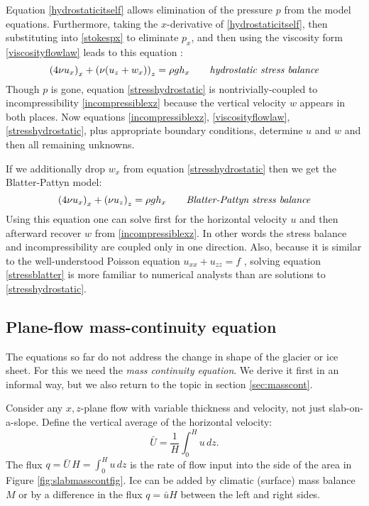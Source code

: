 \documentclass[letterpaper,final,12pt,reqno]{amsart}
\begin{document}
Equation \eqref{hydrostaticitself} allows elimination of the pressure $p$ from the model equations.  Furthermore, taking the $x$-derivative of \eqref{hydrostaticitself}, then substituting into \eqref{stokespx} to eliminate $p_x$, and then using the viscosity form \eqref{viscosityflowlaw} leads to this equation \cite{GreveBlatter2009}:
\begin{equation}
\left(4 \nu u_x\right)_x + \left(\nu (u_z+w_x)\right)_z = \rho g h_x \qquad\text{\emph{hydrostatic stress balance}} \label{stresshydrostatic}
\end{equation}
Though $p$ is gone, equation \eqref{stresshydrostatic} is nontrivially-coupled to incompressibility \eqref{incompressiblexz} because the vertical velocity $w$ appears in both places.  Now equations \eqref{incompressiblexz}, \eqref{viscosityflowlaw}, \eqref{stresshydrostatic}, plus appropriate boundary conditions, determine $u$ and $w$ and then all remaining unknowns.

If we additionally drop $w_x$ from equation \eqref{stresshydrostatic} then we get the Blatter-Pattyn model:
\begin{equation}
\left(4 \nu u_x\right)_x + \left(\nu u_z\right)_z = \rho g h_x \qquad\text{\emph{Blatter-Pattyn stress balance}} \label{stressblatter}
\end{equation}
Using this equation one can solve first for the horizontal velocity $u$ and then afterward recover $w$ from \eqref{incompressiblexz}.  In other words the stress balance and incompressibility are coupled only in one direction.  Also, because it is similar to the well-understood Poisson equation $u_{xx} + u_{zz} = f$ \cite{MortonMayers}, solving equation \eqref{stressblatter} is more familiar to numerical analysts than are solutions to \eqref{stresshydrostatic}.

\subsection*{Plane-flow mass-continuity equation}  The equations so far do not address the change in shape of the glacier or ice sheet.  For this we need the \emph{mass continuity equation}.  We derive it first in an informal way, but we also return to the topic in section \ref{sec:masscont}.

Consider any $x,z$-plane flow with variable thickness and velocity, not just slab-on-a-slope.  Define the vertical average of the horizontal velocity:
	$$\bar U = \frac{1}{H}\int_0^{H} u\,dz.$$
The flux $q=\bar U\, H = \int_0^{H} u\,dz$ is the rate of flow input into the side of the area in Figure \ref{fig:slabmasscontfig}.  Ice can be added by climatic (surface) mass balance $M$ or by a difference in the flux $q=\bar u H$ between the left and right sides.
\end{document}
